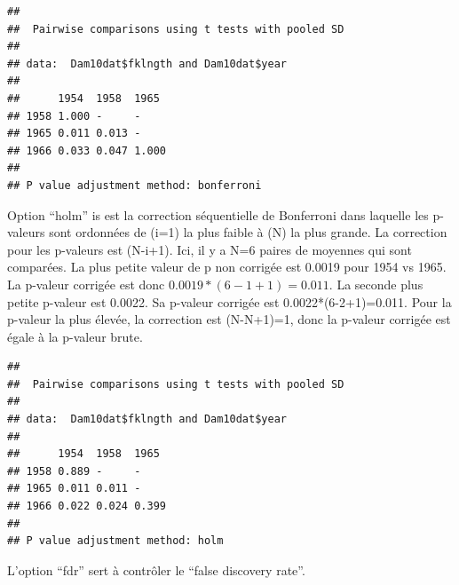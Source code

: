 \documentclass[
  12pt,
]{book}
\newenvironment{Shaded}{\begin{snugshade}}{\end{snugshade}}
\newcommand{\DataTypeTok}[1]{\textcolor[rgb]{0.13,0.29,0.53}{#1}}
\newcommand{\KeywordTok}[1]{\textcolor[rgb]{0.13,0.29,0.53}{\textbf{#1}}}
\newcommand{\NormalTok}[1]{#1}
\newcommand{\OperatorTok}[1]{\textcolor[rgb]{0.81,0.36,0.00}{\textbf{#1}}}
\newcommand{\StringTok}[1]{\textcolor[rgb]{0.31,0.60,0.02}{#1}}
\begin{document}
\begin{Shaded}
\end{Shaded}

\begin{verbatim}
## 
##  Pairwise comparisons using t tests with pooled SD 
## 
## data:  Dam10dat$fklngth and Dam10dat$year 
## 
##      1954  1958  1965 
## 1958 1.000 -     -    
## 1965 0.011 0.013 -    
## 1966 0.033 0.047 1.000
## 
## P value adjustment method: bonferroni
\end{verbatim}

Option ``holm'' is est la correction séquentielle de Bonferroni dans laquelle les p-valeurs sont ordonnées de (i=1) la plus faible à (N) la plus grande. La correction pour les p-valeurs est (N-i+1). Ici, il y a N=6 paires de moyennes qui sont comparées. La plus petite valeur de p non corrigée est 0.0019 pour 1954 vs 1965. La p-valeur corrigée est donc \(0.0019*(6-1+1)=0.011\). La seconde plus petite p-valeur est 0.0022. Sa p-valeur corrigée est 0.0022*(6-2+1)=0.011. Pour la p-valeur la plus élevée, la correction est (N-N+1)=1, donc la p-valeur corrigée est égale à la p-valeur brute.

\begin{Shaded}
\end{Shaded}

\begin{verbatim}
## 
##  Pairwise comparisons using t tests with pooled SD 
## 
## data:  Dam10dat$fklngth and Dam10dat$year 
## 
##      1954  1958  1965 
## 1958 0.889 -     -    
## 1965 0.011 0.011 -    
## 1966 0.022 0.024 0.399
## 
## P value adjustment method: holm
\end{verbatim}

L'option ``fdr'' sert à contrôler le ``false discovery rate''.

\begin{Shaded}
\end{Shaded}
\end{document}
